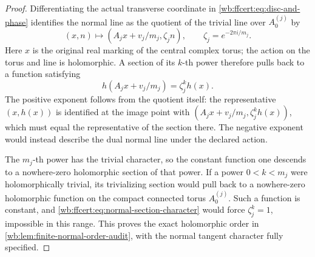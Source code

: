 \begin{proof}
Differentiating the actual transverse coordinate in
\eqref{wb:ffcert:eq:disc-and-phase} identifies the normal line as the
quotient of the trivial line over $A_0^{(j)}$ by
\[
 (x,n)\longmapsto(A_jx+v_j/m_j,\zeta_j n),
 \qquad \zeta_j=e^{-2\pi i/m_j}.
 \tag{FF42}\label{wb:ffcert:eq:normal-action}
\]
Here $x$ is the original real marking of the central complex torus;
the action on the torus and line is holomorphic. A section of its
$k$-th power therefore pulls back to a function satisfying
\[
 h(A_jx+v_j/m_j)=\zeta_j^k h(x).
 \tag{FF43}\label{wb:ffcert:eq:normal-section-character}
\]
The positive exponent follows from the quotient itself: the representative
$(x,h(x))$ is identified at the image point with
$(A_jx+v_j/m_j,\zeta_j^kh(x))$, which must equal the representative
of the section there. The negative exponent would instead describe
the dual normal line under the declared action.

The $m_j$-th power has the trivial character, so the constant function
one descends to a nowhere-zero holomorphic section of that power.
If a power $0<k<m_j$ were holomorphically trivial, its trivializing
section would pull back to a nowhere-zero holomorphic function on the
compact connected torus $A_0^{(j)}$. Such a function is constant,
and \eqref{wb:ffcert:eq:normal-section-character} would force
$\zeta_j^k=1$, impossible in this range. This proves the exact
holomorphic order in \cref{wb:lem:finite-normal-order-audit}, with the
normal tangent character fully specified.


\end{proof}
